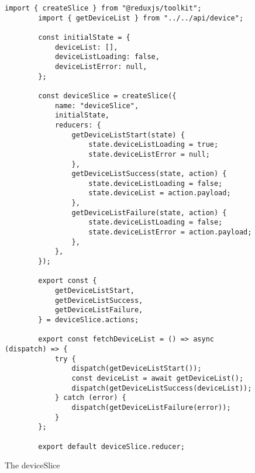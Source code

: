 \begin{figure}[htbp]
    \begin{lstlisting}[language=React]
        import { createSlice } from "@reduxjs/toolkit";
        import { getDeviceList } from "../../api/device";

        const initialState = {
            deviceList: [],
            deviceListLoading: false,
            deviceListError: null,
        };

        const deviceSlice = createSlice({
            name: "deviceSlice",
            initialState,
            reducers: {
                getDeviceListStart(state) {
                    state.deviceListLoading = true;
                    state.deviceListError = null;
                },
                getDeviceListSuccess(state, action) {
                    state.deviceListLoading = false;
                    state.deviceList = action.payload;
                },
                getDeviceListFailure(state, action) {
                    state.deviceListLoading = false;
                    state.deviceListError = action.payload;
                },
            },
        });

        export const {
            getDeviceListStart,
            getDeviceListSuccess,
            getDeviceListFailure,
        } = deviceSlice.actions;

        export const fetchDeviceList = () => async (dispatch) => {
            try {
                dispatch(getDeviceListStart());
                const deviceList = await getDeviceList();
                dispatch(getDeviceListSuccess(deviceList));
            } catch (error) {
                dispatch(getDeviceListFailure(error));
            }
        };

        export default deviceSlice.reducer;
    \end{lstlisting}
    \caption{The deviceSlice}
    \label{fig:deviceSlice}
\end{figure}